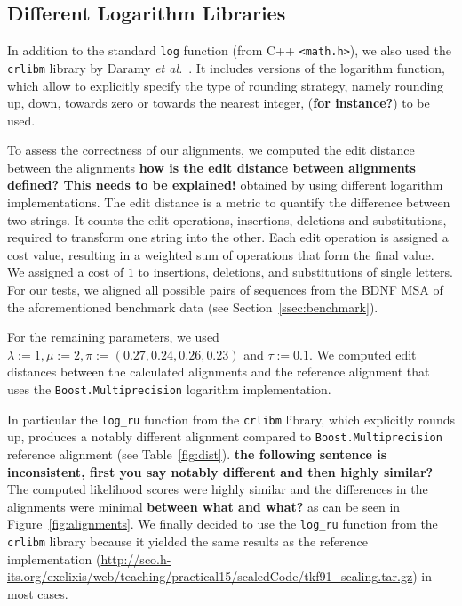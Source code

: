 \documentclass[runningheads,a4paper]{llncs}
\begin{document}

\subsection{Different Logarithm Libraries}
\label{sec:crlibm}

In addition to the standard \texttt{log} function (from C++ \texttt{<math.h>}), 
we also used the \texttt{crlibm} library by Daramy {\em et al.}~\cite{Daramy04}. 
It includes versions of the logarithm function, which allow to explicitly specify the type of rounding strategy, namely rounding up, down, towards zero or towards the nearest integer, ({\bf for instance?}) to be used.

To assess the correctness of our alignments, we computed the edit distance between the alignments {\bf how is the edit distance between alignments defined? This needs to be explained!} 
obtained by using different logarithm implementations. 
The edit distance is a metric to quantify the difference between two strings. It counts the edit operations, insertions, deletions and substitutions, required to transform one string into the other. Each edit operation is assigned a cost value, resulting in a weighted sum of operations that form the final value.
We assigned a cost of $1$ to insertions, deletions, and substitutions of single letters. 
For our tests, we aligned all possible pairs of sequences from the BDNF MSA of the aforementioned benchmark data (see Section~\ref{ssec:benchmark}).

For the remaining parameters, we used $\lambda:=1, \mu:=2, \pi:= (0.27, 0.24, 0.26, 0.23)$ and $\tau := 0.1$. 
We computed edit distances between the calculated alignments and the reference alignment that uses the \texttt{Boost.Multiprecision} logarithm implementation. 

In particular the \texttt{log\_ru} function from the \texttt{crlibm} library, which explicitly rounds up, produces a notably different alignment compared to 
\texttt{Boost.Multiprecision} reference alignment (see Table~\ref{fig:dist}). 
{\bf the following sentence is inconsistent, first you say notably different and then highly similar?} 
The computed likelihood scores were highly similar and the differences in the alignments were minimal {\bf between what and what?} as can be seen in Figure~\ref{fig:alignments}. 
We finally decided to use the \texttt{log\_ru} function from the \texttt{crlibm} library because it yielded the same results as the reference implementation 
(\url{http://sco.h-its.org/exelixis/web/teaching/practical15/scaledCode/tkf91_scaling.tar.gz}) in most cases.
\end{document}
